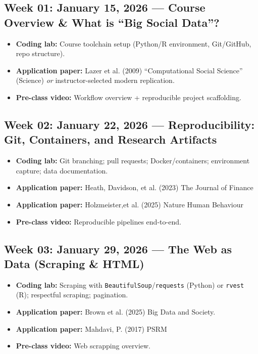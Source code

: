 \documentclass[letterpaper,11pt]{article}
\newcommand{\compresslist}{
\setlength{\itemsep}{1pt}
\setlength{\parskip}{0pt}
\setlength{\parsep}{0pt}
}
\begin{document}
\subsection*{Week 01: January 15, 2026 --- Course Overview \& What is ``Big Social Data''?}
\begin{itemize}\compresslist
\item \textbf{Coding lab:} Course toolchain setup (Python/R environment, Git/GitHub, repo structure).
\item \textbf{Application paper:} Lazer et al. (2009) ``Computational Social Science'' (Science) \emph{or} instructor-selected modern replication.
\item \textbf{Pre-class video:} Workflow overview + reproducible project scaffolding.
\end{itemize}



\subsection*{Week 02: January 22, 2026 --- Reproducibility: Git, Containers, and Research Artifacts}
\begin{itemize}\compresslist
\item \textbf{Coding lab:} Git branching; pull requests; Docker/containers; environment capture; data documentation.
\item \textbf{Application paper:} Heath, Davidson, et al. (2023) The Journal of Finance
\item \textbf{Application paper:} Holzmeister,et al. (2025) Nature Human Behaviour
\item \textbf{Pre-class video:} Reproducible pipelines end-to-end.
\end{itemize}

\subsection*{Week 03: January 29, 2026 --- The Web as Data (Scraping \& HTML)}
\begin{itemize}\compresslist
\item \textbf{Coding lab:} Scraping with \texttt{BeautifulSoup}/\texttt{requests} (Python) or \texttt{rvest} (R); respectful scraping; pagination.
\item \textbf{Application paper:} Brown et al. (2025) Big Data and Society.
\item \textbf{Application paper:} Mahdavi, P. (2017) PSRM
\item \textbf{Pre-class video:} Web scrapping overview.
\end{itemize}
\end{document}
